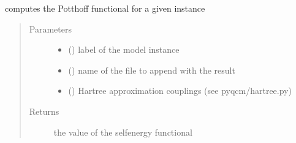 \documentclass[letterpaper,10pt,english]{sphinxmanual}
\begin{document}
\begin{fulllineitems}
\label{\detokenize{functions:pyqcm.Potthoff_functional}}
\sphinxAtStartPar
computes the Potthoff functional for a given instance
\begin{quote}\begin{description}
\item[{Parameters}] \leavevmode\begin{itemize}
\item {} 
\sphinxAtStartPar
{} () \textendash{} label of the model instance

\item {} 
\sphinxAtStartPar
{} () \textendash{} name of the file to append with the result

\item {} 
\sphinxAtStartPar
{} (\sphinxstyleliteralemphasis{\sphinxupquote{(}}\sphinxstyleliteralemphasis{\sphinxupquote{)}}) \textendash{} Hartree approximation couplings (see pyqcm/hartree.py)

\end{itemize}

\item[{Returns}] \leavevmode
\sphinxAtStartPar
the value of the self\sphinxhyphen{}energy functional

\end{description}\end{quote}

\end{fulllineitems}

\end{document}
